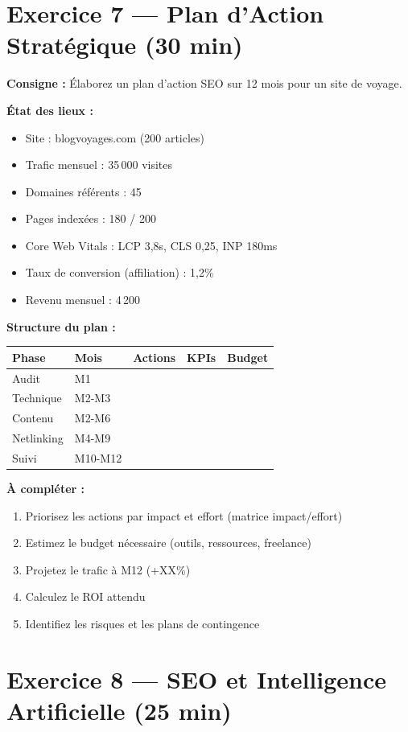 \documentclass[12pt,a4paper]{report}
\begin{document}
\section{Exercice 7 --- Plan d'Action Strat\'{e}gique (30 min)}

\textbf{Consigne :} \'{E}laborez un plan d'action SEO sur 12 mois pour un site de voyage.

\textbf{\'{E}tat des lieux :}
\begin{itemize}
    \item Site : blogvoyages.com (200 articles)
    \item Trafic mensuel : 35\,000 visites
    \item Domaines r\'{e}f\'{e}rents : 45
    \item Pages index\'{e}es : 180 / 200
    \item Core Web Vitals : LCP 3,8s, CLS 0,25, INP 180ms
    \item Taux de conversion (affiliation) : 1,2\%
    \item Revenu mensuel : 4\,200\,\texteuro{}
\end{itemize}

\textbf{Structure du plan :}

\begin{longtable}{lllll}
\toprule
Phase & Mois & Actions & KPIs & Budget \\
\midrule
\endhead
\bottomrule
\endfoot
Audit & M1 & & & \\
Technique & M2-M3 & & & \\
Contenu & M2-M6 & & & \\
Netlinking & M4-M9 & & & \\
Suivi & M10-M12 & & & \\
\bottomrule
\end{longtable}

\textbf{\`{A} compl\'{e}ter :}
\begin{enumerate}
    \item Priorisez les actions par impact et effort (matrice impact/effort)
    \item Estimez le budget n\'{e}cessaire (outils, ressources, freelance)
    \item Projetez le trafic \`{a} M12 (+XX\%)
    \item Calculez le ROI attendu
    \item Identifiez les risques et les plans de contingence
\end{enumerate}

\section{Exercice 8 --- SEO et Intelligence Artificielle (25 min)}
\end{document}
